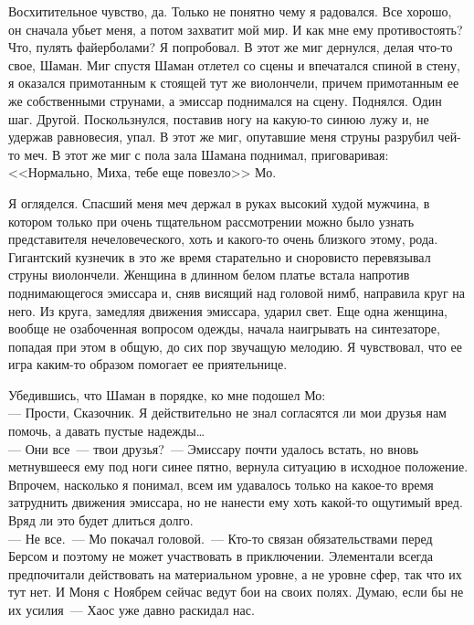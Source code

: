 Восхитительное чувство, да. Только не понятно чему я радовался. Все хорошо, он 
сначала убьет меня, а потом захватит мой мир. И как мне ему противостоять? Что, 
пулять файерболами? Я попробовал. В этот же миг дернулся, делая что-то свое, 
Шаман. Миг спустя Шаман отлетел со сцены и впечатался спиной в стену, я 
оказался примотанным к стоящей тут же виолончели, причем примотанным ее же собственными 
струнами, а эмиссар поднимался на сцену. Поднялся. Один шаг. Другой. 
Поскользнулся, поставив ногу на какую-то синюю лужу и, не удержав равновесия, 
упал. В этот же миг, опутавшие меня струны разрубил чей-то меч. В этот же миг с 
пола зала Шамана поднимал, приговаривая: <<Нормально, Миха, тебе еще повезло>> 
Мо.

Я огляделся. Спасший меня меч держал в руках высокий худой мужчина, в котором 
только при очень тщательном рассмотрении можно было узнать представителя 
нечеловеческого, хоть и какого-то очень близкого этому, рода. Гигантский 
кузнечик в это же время старательно и сноровисто перевязывал струны виолончели. 
Женщина в длинном белом платье встала напротив поднимающегося эмиссара и, сняв 
висящий над головой нимб, направила круг на него. Из круга, замедляя движения 
эмиссара, ударил свет. Еще одна женщина, вообще не озабоченная вопросом одежды, 
начала наигрывать на синтезаторе, попадая при этом в общую, до сих пор звучащую 
мелодию. Я чувствовал, что ее игра каким-то образом помогает ее приятельнице.

Убедившись, что Шаман в порядке, ко мне подошел Мо:\\
--- Прости, Сказочник. Я действительно не знал согласятся ли мои друзья нам 
помочь, а давать пустые надежды\ldots\\
--- Они все~--- твои друзья?~--- Эмиссару почти удалось встать, но вновь 
метнувшееся ему под ноги синее пятно, вернула ситуацию в исходное положение. Впрочем, 
насколько я понимал, всем им удавалось только на какое-то время затруднить 
движения эмиссара, но не нанести ему хоть какой-то ощутимый вред. Вряд ли это 
будет длиться долго.\\
--- Не все.~--- Мо покачал головой.~--- Кто-то связан обязательствами перед 
Берсом и поэтому не может участвовать в приключении. Элементали всегда предпочитали 
действовать на материальном уровне, а не уровне сфер, так что их тут нет. И 
Моня с Ноябрем сейчас ведут бои на своих полях. Думаю, если бы не их усилия~--- Хаос 
уже давно раскидал нас.

